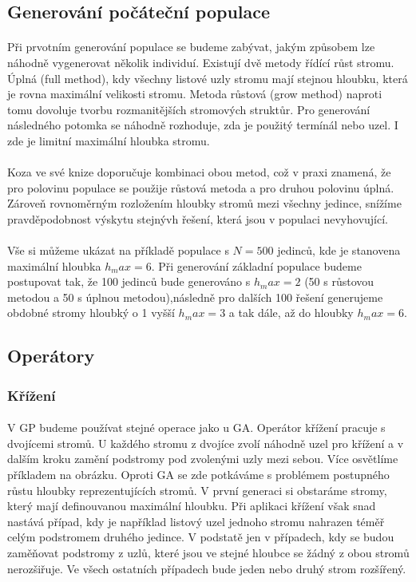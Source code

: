 \documentclass[bc,male,java,dept460]{diploma}		%
\begin{document}
\subsection{Generování počáteční populace}
\paragraph*{}
Při prvotním generování populace se budeme zabývat, jakým způsobem lze náhodně vygenerovat několik individuí. Existují dvě metody řídící růst stromu. Úplná (full method), kdy všechny listové uzly stromu mají stejnou hloubku, která je rovna maximální velikosti stromu. Metoda růstová (grow method) naproti tomu dovoluje tvorbu rozmanitějších stromových struktůr. Pro generování následného potomka se náhodně rozhoduje, zda je použitý termínál nebo uzel. I zde je limitní maximální hloubka stromu.
\paragraph*{}
Koza ve své knize \cite{kozagp} doporučuje kombinaci obou metod, což v praxi znamená, že pro polovinu populace se použije růstová metoda a pro druhou polovinu úplná. Zároveň rovnoměrným rozložením hloubky stromů mezi všechny jedince, snížíme pravděpodobnost výskytu stejnývh řešení, která jsou v populaci nevyhovující. 
\paragraph*{}
Vše si můžeme ukázat na příkladě populace s $N=500$ jedinců, kde je stanovena maximální hloubka $h_max=6$. Při generování základní populace budeme postupovat tak, že 100 jedinců bude generováno s $h_max=2$ (50 s růstovou metodou a 50 s úplnou metodou),následně pro dalších 100 řešení generujeme obdobné stromy hloubký o 1 vyšší $h_max=3$ a tak dále, až do hloubky $h_max=6$.

\subsection{Operátory}

\subsubsection{Křížení}
\paragraph*{}
V GP budeme používat stejné operace jako u GA. Operátor křížení pracuje s dvojícemi stromů. U každého stromu z dvojíce zvolí náhodně uzel pro křížení a v dalším kroku zamění podstromy pod zvolenými uzly mezi sebou. Více osvětlíme příkladem na obrázku. Oproti GA se zde potkáváme s problémem postupného růstu hloubky reprezentujících stromů. V první generaci si obstaráme stromy, který mají definouvanou maximální hloubku. Při aplikaci křížení však snad nastává případ, kdy je například listový uzel jednoho stromu nahrazen téměř celým podstromem druhého jedince. V podstatě jen v případech, kdy se budou zaměňovat podstromy z uzlů, které jsou ve stejné hloubce se žádný z obou stromů nerozšiřuje. Ve všech ostatních případech bude jeden nebo druhý strom rozšířený.
\end{document}
